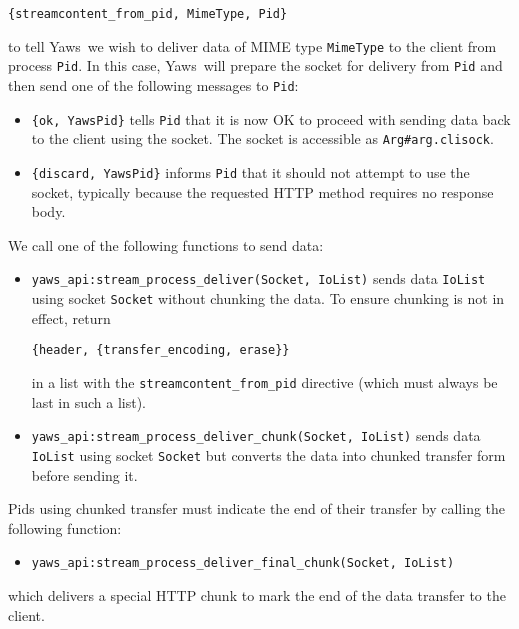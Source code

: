\documentclass[11pt,oneside,english]{book}
\newcommand{\Yaws}            %
        {{\sc Yaws}}
\begin{document}
\begin{verbatim}
{streamcontent_from_pid, MimeType, Pid}
\end{verbatim}

\noindent to tell \Yaws\ we wish to deliver data of MIME type
\verb+MimeType+ to the client from process \verb+Pid+. In this case,
\Yaws\ will prepare the socket for delivery from \verb+Pid+ and then
send one of the following messages to \verb+Pid+:
\begin{itemize}
\item \verb+{ok, YawsPid}+ tells \verb+Pid+ that it is now OK to
  proceed with sending data back to the client using the socket. The
  socket is accessible as \verb+Arg#arg.clisock+.

\item \verb+{discard, YawsPid}+ informs \verb+Pid+ that it should not
  attempt to use the socket, typically because the requested HTTP
  method requires no response body.
\end{itemize}

We call one of the following functions to send data:
\begin{itemize}
\item \verb+yaws_api:stream_process_deliver(Socket, IoList)+ sends data
  \verb+IoList+ using socket \verb+Socket+ without chunking the data. To
  ensure chunking is not in effect, return

\begin{verbatim}
{header, {transfer_encoding, erase}}
\end{verbatim}

  in a list with the \verb+streamcontent_from_pid+ directive (which must
  always be last in such a list).

\item \verb+yaws_api:stream_process_deliver_chunk(Socket, IoList)+
  sends data \verb+IoList+ using socket \verb+Socket+ but converts
  the data into chunked transfer form before sending it.
\end{itemize}

Pids using chunked transfer must indicate the end of their transfer by
calling the following function:
\begin{itemize}
\item \verb+yaws_api:stream_process_deliver_final_chunk(Socket, IoList)+
\end{itemize}

which delivers a special HTTP chunk to mark the end of the data
transfer to the client.
\end{document}
